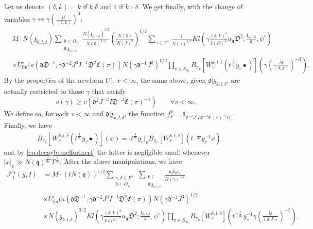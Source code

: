 \documentclass[a4paper,11pt]{amsart}
\theoremstyle{definition}
\newcommand{\fin}{\text{fin}}
\begin{document}
Let us denote $(\delta,k) = k$ if $k|\delta$ and $1$ if $k\nmid \delta$. We get finally, with the change of variables $\gamma \leftrightarrow \gamma(\frac{l\delta}{(\delta,k)})^{3}$:
      \begin{align*}
           &M\cdot N(\mathfrak{z}_{k,l,\delta})\sum_{\substack{\mathfrak{d}\subset O_F\\\mathfrak{d}|\mathfrak{z}_{k,l,\delta}}}\frac{N(\mathfrak{z}_{k,l,\delta})^{1/2}}{N(\mathfrak{d})^{1/2}}\left(\frac{N(\mathfrak{d})}{N(J)^3}\right)^{1/2}\sum_{\gamma \in F^{\times}}\frac{1}{N(\gamma)^{1/2}}Kl\left(\gamma\frac{(\delta,k)^3}{k(l\delta)^{2}}\alpha_{\mathfrak{q}}\mathfrak{D}^2;\frac{\mathfrak{z}_{k,l,\delta}}{\mathfrak{d}},\psi^{\circ}\right)\nonumber\\
    &\times U_{\fin}^{\circ}(a(\mathfrak{d}\mathfrak{D}^{-1},\gamma \mathfrak{d}^{-2}J^3I^{-1}\mathfrak{D}^2\mathfrak{C}(\pi))N(\gamma\mathfrak{d}^{-1}J^3)^{1/2}\prod_{v\in S_{\infty}}B_{\pi_v}[W_v^{k,l,\delta}(t^{\frac{1}{d_v}}y_v\bullet)]\left(\gamma(\frac{l\delta}{(\delta,k)})^{-3}\right).
      \end{align*}
By the properties of the newform $U_{v}^{\circ}$, $v<\infty$, the sums above, given $\mathfrak{d}|\mathfrak{z}_{k,l,\delta}$, are actually restricted to those $\gamma$ that satisfy \begin{equation*}
    v(\gamma) \geq v(\mathfrak{d}^{2}J^{-3}I\mathfrak{D}^{-3}\mathfrak{C}(\pi)^{-1})\qquad \forall v<\infty,\end{equation*}
We define so, for each $v < \infty$ and $\mathfrak{d}|\mathfrak{z}_{k,l,\delta}$, the function $f_v^{\mathfrak{d}} =\mathbb{1}_{\mathfrak{d}^{-2}J^{3}I\mathfrak{D}^{-3}\mathfrak{C}(\pi)^{-1}O_v}$.
Finally, we have \begin{align*}
    &B_{\pi_v}[W_v^{k,l,\delta}(t^{\frac{1}{d_v}}y_v\bullet)](x) = 
 \vert{t^{\frac{1}{d_{v}}}y_v}\vert_v B_{\pi_v}[W^{k,l,\delta}_{v}](t^{-\frac{1}{d_v}}y_v^{-1}x)\end{align*}
 and by \eqref{eq:decaybesselforinert} the latter is negligible small whenever $\vert{x}\vert_v \gg N(\mathfrak{q})^{\frac{\epsilon}{d_{\infty}}}T^{\frac{1}{d_v}}$.
After the above manipulations, we have 
\begin{align}\label{eq:10.2.3}
    \mathcal{F}^{\chi}_t(y,I) &=  M\cdot (tN(\mathfrak{q}))^{1/2}\sum_{\substack{\gamma,\delta \in F^{\times}\\\mathfrak{d}\subset O_F}}\sum_{\substack{k,l\\ \mathfrak{d}|\mathfrak{z}_{k,l,\delta}}}\frac{a_{\delta}b_kc_l}{N(\gamma)^{1/2}} \nonumber\\& \times U_{\fin}^{\circ}(a(\mathfrak{d}\mathfrak{D}^{-1},\gamma \mathfrak{d}^{-2}J^3I^{-1}\mathfrak{D}^2\mathfrak{C}(\pi))N(\gamma\mathfrak{d}^{-1}J^3)^{1/2} \nonumber\\&\times N(\mathfrak{z}_{k,l,\delta})^{3/2}Kl\left(\gamma\frac{(\delta,k)^3}{k(l\delta)^{2}}\alpha_{\mathfrak{q}}\mathfrak{D}^2;\frac{\mathfrak{z}_{k,l,\delta}}{\mathfrak{d}},\psi^{\circ}\right)\prod_{v\in S_{\infty}}B_{\pi_v}[W_v^{k,l,\delta}]\left(t^{-\frac{1}{d_v}}y_v^{-1}\gamma\left(\frac{l\delta}{(\delta,k)}\right)^{-3}\right).
\end{align}
\end{document}
